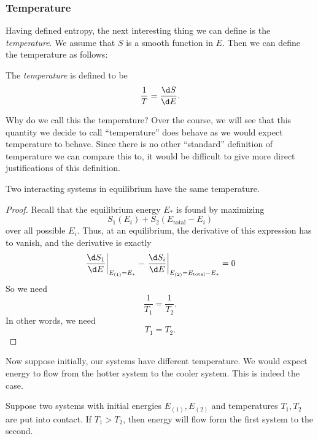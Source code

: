 \documentclass[a4paper]{article}
\begin{document}
\subsubsection*{Temperature}
Having defined entropy, the next interesting thing we can define is the \emph{temperature}. We assume that $S$ is a smooth function in $E$. Then we can define the temperature as follows:
\begin{defi}[Temperature]
  The \emph{temperature} is defined to be
  \[
    \frac{1}{T} = \frac{\d S}{\d E}.
  \]
\end{defi}
Why do we call this the temperature? Over the course, we will see that this quantity we decide to call ``temperature'' does behave as we would expect temperature to behave. Since there is no other ``standard'' definition of temperature we can compare this to, it would be difficult to give more direct justifications of this definition.

\begin{prop}
  Two interacting systems in equilibrium have the same temperature.
\end{prop}

\begin{proof}
  Recall that the equilibrium energy $E_*$ is found by maximizing
  \[
    S_1(E_i) + S_2(E_{\mathrm{total}} - E_i)
  \]
  over all possible $E_i$. Thus, at an equilibrium, the derivative of this expression has to vanish, and the derivative is exactly
  \[
    \left.\frac{\d S_1}{\d E}\right|_{E_{(1)} = E_*} - \left.\frac{\d S_i}{\d E} \right|_{E_{(2)} = E_{\mathrm{total}} - E_*} = 0
  \]
  So we need
  \[
    \frac{1}{T_1} = \frac{1}{T_2}.
  \]
  In other words, we need
  \[
    T_1 = T_2.
  \]
\end{proof}

Now suppose initially, our systems have different temperature. We would expect energy to flow from the hotter system to the cooler system. This is indeed the case.

\begin{prop}
  Suppose two systems with initial energies $E_{(1)}, E_{(2)}$ and temperatures $T_1, T_2$ are put into contact. If $T_1 > T_2$, then energy will flow form the first system to the second.
\end{prop}
\end{document}
